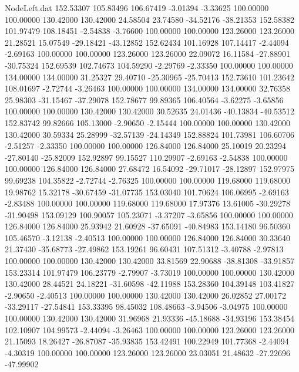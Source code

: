 \begin{filecontents}{NodeLeft.dat}
 152.53307  105.83496  106.67419    -3.01394   -3.33625  100.00000  100.00000  130.42000  130.42000   24.58504   23.74580  -34.52176  -38.21353
 152.58382  101.97479  108.18451    -2.54838   -3.76600  100.00000  100.00000  123.26000  123.26000   21.28521   15.07549  -29.18421  -43.12852
 152.62434  101.16928  107.14417    -2.44094   -2.69163  100.00000  100.00000  123.26000  123.26000   22.09072   16.11584  -27.88901  -30.75324
 152.69539  102.74673  104.59290    -2.29769   -2.33350  100.00000  100.00000  134.00000  134.00000   31.25327   29.40710  -25.30965  -25.70413
 152.73610  101.23642  108.01697    -2.72744   -3.26463  100.00000  100.00000  134.00000  134.00000   32.76358   25.98303  -31.15467  -37.29078
 152.78677   99.89365  106.40564    -3.62275   -3.65856  100.00000  100.00000  130.42000  130.42000   30.52635   24.01436  -40.13834  -40.53512
 152.83742   99.82666  105.13000    -2.90650   -2.15444  100.00000  100.00000  130.42000  130.42000   30.59334   25.28999  -32.57139  -24.14349
 152.88824  101.73981  106.60706    -2.51257   -2.33350  100.00000  100.00000  126.84000  126.84000   25.10019   20.23294  -27.80140  -25.82009
 152.92897   99.15527  110.29907    -2.69163   -2.54838  100.00000  100.00000  126.84000  126.84000   27.68472   16.54092  -29.71017  -28.12897
 152.97975   99.69238  104.35822    -2.72744   -2.76325  100.00000  100.00000  119.68000  119.68000   19.98762   15.32178  -30.67459  -31.07735
 153.03040  101.70624  106.06995    -2.69163   -2.83488  100.00000  100.00000  119.68000  119.68000   17.97376   13.61005  -30.29278  -31.90498
 153.09129  100.90057  105.23071    -3.37207   -3.65856  100.00000  100.00000  126.84000  126.84000   25.93942   21.60928  -37.65091  -40.84983
 153.14180   96.50360  105.46570    -3.12138   -2.40513  100.00000  100.00000  126.84000  126.84000   30.33640   21.37430  -35.68773  -27.49862
 153.19261   96.60431  107.51312    -3.40788   -2.97813  100.00000  100.00000  130.42000  130.42000   33.81569   22.90688  -38.81308  -33.91857
 153.23314  101.97479  106.23779    -2.79907   -3.73019  100.00000  100.00000  130.42000  130.42000   28.44521   24.18221  -31.60598  -42.11988
 153.28360  104.39148  103.41827    -2.90650   -2.40513  100.00000  100.00000  130.42000  130.42000   26.02852   27.00172  -33.29117  -27.54841
 153.33395   98.45032  108.48663    -3.94506   -3.04975  100.00000  100.00000  130.42000  130.42000   31.96968   21.93336  -45.18688  -34.93196
 153.38454  102.10907  104.99573    -2.44094   -3.26463  100.00000  100.00000  123.26000  123.26000   21.15093   18.26427  -26.87087  -35.93835
 153.42491  100.22949  101.77368    -2.44094   -4.30319  100.00000  100.00000  123.26000  123.26000   23.03051   21.48632  -27.22696  -47.99902

\end{filecontents}
